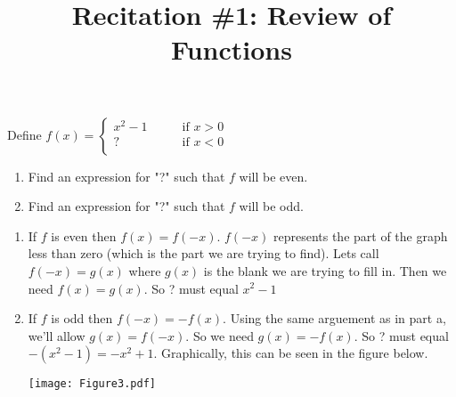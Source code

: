 \documentclass[noinstructornotes]{ximera}
\title{Recitation \#1: Review of Functions}
\begin{document}
\begin{abstract}		\end{abstract}
\maketitle















\begin{problem}
Define 
	$f(x) =   \left\{ \begin{array}{cl}
	x^2-1		 	&	\qquad \text{if } x > 0					\\
	\text{? }			&	\qquad \text{if }  x < 0 	\\		\end{array} \right.  $
\begin{enumerate}	
	\item  Find an expression for "?" such that $f$ will be even.
	
	\item  Find an expression for "?" such that $f$ will be odd.
	
	\end{enumerate}
	
	\begin{freeResponse}

		\begin{enumerate}

		
		\item  
			If $f$ is even then $f(x)=f(-x)$.  $f(-x)$ represents the part of the graph less than zero (which is the part we are trying to find).  Lets call $f(-x)=g(x)$ where $g(x)$ is the blank we are trying to fill in.  Then we need $f(x)=g(x)$.  So ? must equal $x^2-1$
		
		\item   If $f$ is odd then $f(-x)=-f(x)$.  Using the same arguement as in part a, we'll allow $g(x)=f(-x)$.  So we need $g(x)=-f(x)$.  So ? must equal $-(x^2-1) =-x^2+1$.  Graphically, this can be seen in the figure below.

	\begin{image}		
	\texttt{[image: Figure3.pdf]}
	\end{image}
		
		\end{enumerate}
	\end{freeResponse}
	
\end{problem}
\end{document}
